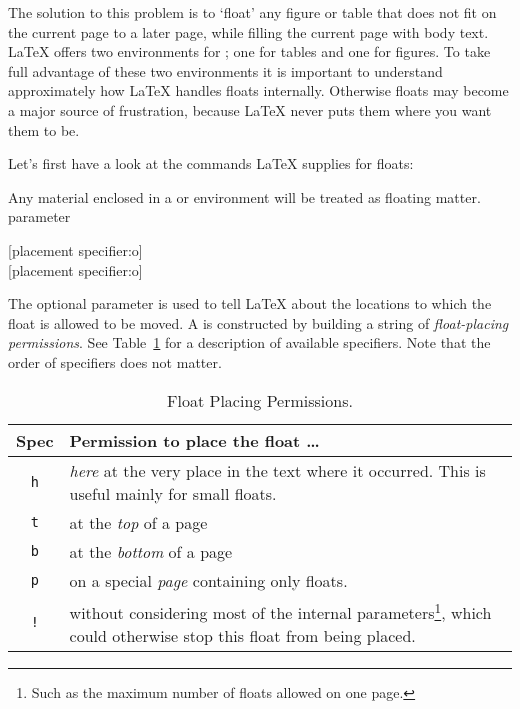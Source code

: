 The solution to this problem is to `float' any figure or table that
does not fit on the current page to a later page, while filling the
current page with body text. \LaTeX{} offers two environments for
; one for tables and  one for figures.  To
take full advantage of these two environments it is important to
understand approximately how \LaTeX{} handles floats internally.
Otherwise floats may become a major source of frustration, because
\LaTeX{} never puts them where you want them to be.

Let's first have a look at the commands \LaTeX{} supplies
for floats:

Any material enclosed in a  or  environment will
be treated as floating matter.
parameter
\begin{lscommand}
  [placement specifier:o] \\
  [placement specifier:o]
\end{lscommand}
The optional  parameter is used to tell \LaTeX{}
about the locations to which the float is allowed to be moved.  A
 is constructed by building a string of
\emph{float-placing permissions}. See Table~\ref{tab:permiss} for a description
of available specifiers. Note that the order of specifiers does not matter.

\begin{table}
  \begin{minipage}{\textwidth}
    \centering
    \caption{Float Placing Permissions.}\label{tab:permiss}
    \begin{tabular}{@{}cp{8cm}@{}}
      \toprule
      Spec       & Permission to place the float \ldots             \\
      \midrule
      \texttt{h} & \emph{here} at the very place in the text
      where it occurred.  This is useful mainly for small floats.   \\
      \texttt{t} & at the \emph{top} of a page                      \\
      \texttt{b} & at the \emph{bottom} of a page                   \\
      \texttt{p} & on a special \emph{page} containing only floats. \\
      \texttt{!} & without considering most of the
      internal parameters\footnote{Such as the
        maximum number of floats allowed  on one page.},
      which could otherwise stop this
      float from being placed.                                      \\
      \bottomrule
    \end{tabular}
  \end{minipage}
\end{table}

